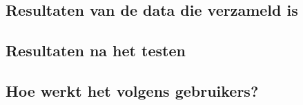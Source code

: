 
\chapter{}
\label{ch:resultaten}

\section{Resultaten van de data die verzameld is}

\section{Resultaten na het testen}

\section{Hoe werkt het volgens gebruikers?}